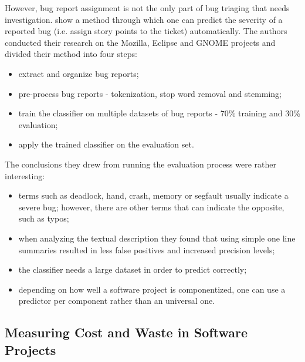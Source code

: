 \documentclass{mprop}
\begin{document}
However, bug report assignment is not the only part of bug triaging that needs
investigation. \citet{lamkanfi2010predicting} show a method through which one
can predict the severity of a reported bug (i.e. assign story points to the 
ticket) automatically. The authors conducted their research on the Mozilla,
Eclipse and GNOME projects and divided their method into four steps:
  \begin{itemize}
    \item extract and organize bug reports;
    \item pre-process bug reports - tokenization, stop word removal and stemming;
    \item train the classifier on multiple datasets of bug reports - 70\% 
      training and 30\% evaluation;
    \item apply the trained classifier on the evaluation set.
  \end{itemize}
The conclusions they drew from running the evaluation process were rather 
interesting:
  \begin{itemize}
    \item terms such as deadlock, hand, crash, memory or segfault usually indicate
      a severe bug; however, there are other terms that can indicate the opposite,
      such as typos;
    \item when analyzing the textual description they found that using simple
      one line summaries resulted in less false positives and increased precision
      levels;
    \item the classifier needs a large dataset in order to predict correctly;
    \item depending on how well a software project is componentized, one can 
      use a predictor per component rather than an universal one.
  \end{itemize}

\subsection{Measuring Cost and Waste in Software Projects}\label{waste}
\end{document}

